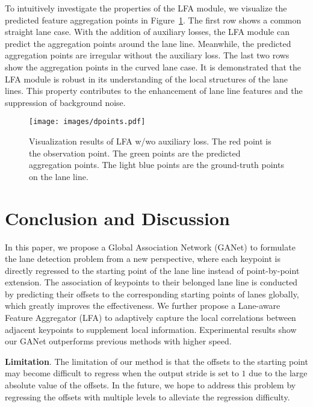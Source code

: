 \documentclass[10pt,twocolumn,letterpaper]{article}
\begin{document}
To intuitively investigate the properties of the LFA module, we visualize the predicted feature aggregation points in Figure~\ref{fig:dpoints}. The first row shows a common straight lane case. With the addition of auxiliary losses, the LFA module can predict the aggregation points around the lane line. Meanwhile, the predicted aggregation points are irregular without the auxiliary loss. The last two rows show the aggregation points in the curved lane case. It is demonstrated that the LFA module is robust in its understanding of the local structures of the lane lines. This property contributes to the enhancement of lane line features and the suppression of background noise.

\begin{figure}[!htbp]
    \centering
    \texttt{[image: images/dpoints.pdf]}
    \caption{Visualization results of LFA w/wo auxiliary loss. The red point is the observation point. The green points are the predicted aggregation points. The light blue points are the ground-truth points on the lane line.}
    \label{fig:dpoints}
\end{figure}

\section{Conclusion and Discussion}
In this paper, we propose a Global Association Network (GANet) to formulate the lane detection problem from a new perspective, where each keypoint is directly regressed to the starting point of the lane line instead of point-by-point extension.
The association of keypoints to their belonged lane line is conducted by predicting their offsets to the corresponding starting points of lanes globally, which greatly improves the effectiveness. 
We further propose a Lane-aware Feature Aggregator (LFA) to adaptively capture the local correlations between adjacent keypoints to supplement local information.
Experimental results show our GANet outperforms previous methods with higher speed.

\textbf{Limitation}. The limitation of our method is that the offsets to the starting point may become difficult to regress when the output stride is set to $1$ due to the large absolute value of the offsets. 
In the future, we hope to address this problem by regressing the offsets with multiple levels to alleviate the regression difficulty.


{\small


}
\end{document}

